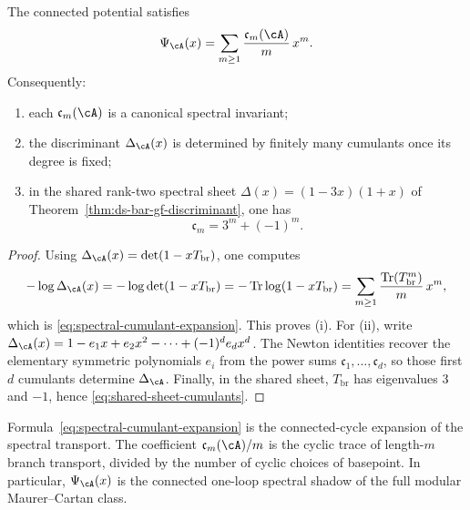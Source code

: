 \begin{theorem}
\label{thm:spectral-cumulant-hierarchy}
The connected potential satisfies
\begin{equation}
\label{eq:spectral-cumulant-expansion}
\Psi_{\cA}(x)
=
\sum_{m\geq 1}
\frac{\mathfrak c_m(\cA)}{m}
\,x^m.
\end{equation}
Consequently:
\begin{enumerate}[label=\textup{(\roman*)}]
\item each \(\mathfrak c_m(\cA)\) is a canonical spectral invariant;
\item the discriminant \(\Delta_{\cA}(x)\) is determined by finitely
 many cumulants once its degree is fixed;
\item in the shared rank-two spectral sheet
 \(\Delta(x)=(1-3x)(1+x)\) of
 Theorem~\ref{thm:ds-bar-gf-discriminant}, one has
 \begin{equation}
 \label{eq:shared-sheet-cumulants}
 \mathfrak c_m=3^m+(-1)^m.
 \end{equation}
\end{enumerate}
\end{theorem}

\begin{proof}
Using \(\Delta_{\cA}(x)=\det(1-xT_{\mathrm{br}})\), one computes
\[
-\log\Delta_{\cA}(x)
=
-\log\det(1-xT_{\mathrm{br}})
=
-\operatorname{Tr}\log(1-xT_{\mathrm{br}})
=
\sum_{m\geq 1}
\frac{\operatorname{Tr}(T_{\mathrm{br}}^m)}{m}
\,x^m,
\]
which is \eqref{eq:spectral-cumulant-expansion}. This proves
\textup{(i)}. For \textup{(ii)}, write
\(\Delta_{\cA}(x)=1-e_1x+e_2x^2-\cdots+(-1)^d e_dx^d\). The Newton
identities recover the elementary symmetric polynomials \(e_i\) from the
power sums \(\mathfrak c_1,\dots,\mathfrak c_d\), so those first \(d\)
cumulants determine \(\Delta_{\cA}\). Finally, in the shared sheet,
\(T_{\mathrm{br}}\) has eigenvalues \(3\) and \(-1\), hence
\eqref{eq:shared-sheet-cumulants}.
\end{proof}

\begin{remark}
\label{rem:connected-cycle-interpretation}
Formula~\eqref{eq:spectral-cumulant-expansion} is the connected-cycle
expansion of the spectral transport. The coefficient
\(\mathfrak c_m(\cA)/m\) is the cyclic trace of length-\(m\) branch
transport, divided by the number of cyclic choices of basepoint. In
particular, \(\Psi_{\cA}(x)\) is the connected one-loop spectral shadow
of the full modular Maurer--Cartan class.
\end{remark}

